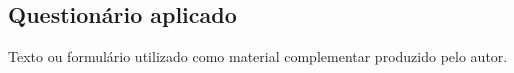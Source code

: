 \begin{apendicesenv}
	\chapter{Questionário aplicado}
	Texto ou formulário utilizado como material complementar produzido pelo autor.
\end{apendicesenv}
